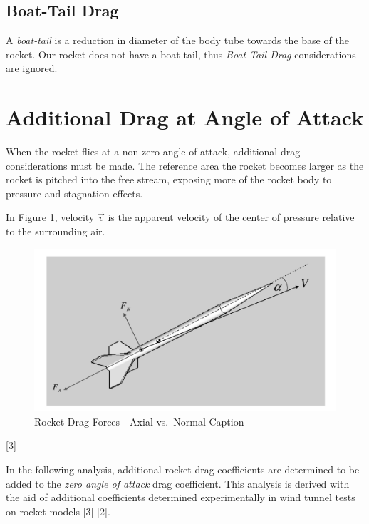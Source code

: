 \documentclass[]{book}
\begin{document}
\subsection{Boat-Tail Drag}\label{boat-tail-drag}

A \emph{boat-tail} is a reduction in diameter of the body tube towards
the base of the rocket. Our rocket does not have a boat-tail, thus
\emph{Boat-Tail Drag} considerations are ignored.

\clearpage 

\section{Additional Drag at Angle of
Attack}\label{additional-drag-at-angle-of-attack}

When the rocket flies at a non-zero angle of attack, additional drag
considerations must be made. The reference area the rocket becomes
larger as the rocket is pitched into the free stream, exposing more of
the rocket body to pressure and stagnation effects.

In Figure \ref{rocket_drag_aoa_label}, velocity \(\vec{v}\) is the
apparent velocity of the center of pressure relative to the surrounding
air.

\begin{figure}[htbp]
\centering
\includegraphics{images/rocket_drag_forces.png}
\caption{Rocket Drag Forces - Axial vs.~Normal Caption
\label{rocket_drag_aoa_label}}
\end{figure}

{[}3{]}

In the following analysis, additional rocket drag coefficients are
determined to be added to the \emph{zero angle of attack} drag
coefficient. This analysis is derived with the aid of additional
coefficients determined experimentally in wind tunnel tests on rocket
models {[}3{]} {[}2{]}.
\end{document}
